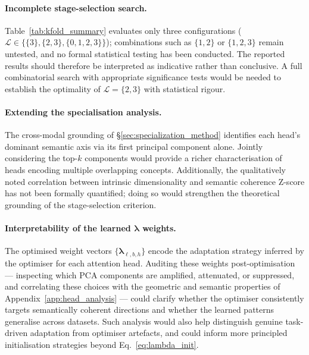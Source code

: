 \paragraph{Incomplete stage-selection search.}

Table~\ref{tab:kfold_summary} evaluates only three configurations 
($\mathcal{L} \in \{\{3\},\{2,3\},\{0,1,2,3\}\}$); combinations such 
as $\{1,2\}$ or $\{1,2,3\}$ remain untested, and no formal statistical 
testing has been conducted. The reported results should therefore be 
interpreted as indicative rather than conclusive. A full combinatorial 
search with appropriate significance tests would be needed to establish 
the optimality of $\mathcal{L}=\{2,3\}$ with statistical rigour.

\paragraph{Extending the specialisation analysis.}

The cross-modal grounding of \S\ref{sec:specialization_method} 
identifies each head's dominant semantic axis via its first principal 
component alone. Jointly considering the top-$k$ components would 
provide a richer characterisation of heads encoding multiple overlapping 
concepts. Additionally, the qualitatively noted correlation between 
intrinsic dimensionality and semantic coherence Z-score has not been 
formally quantified; doing so would strengthen the theoretical grounding 
of the stage-selection criterion.

\paragraph{Interpretability of the learned $\boldsymbol{\lambda}$ weights.}

The optimised weight vectors $\{\boldsymbol{\lambda}_{\ell,b,h}\}$ encode
the adaptation strategy inferred by the optimiser for each attention head.
Auditing these weights post-optimisation — inspecting which PCA components
are amplified, attenuated, or suppressed, and correlating these choices
with the geometric and semantic properties of Appendix~\ref{app:head_analysis}
— could clarify whether the optimiser consistently targets semantically
coherent directions and whether the learned patterns generalise across
datasets. Such analysis would also help distinguish genuine task-driven
adaptation from optimiser artefacts, and could inform more principled
initialisation strategies beyond Eq.~\eqref{eq:lambda_init}.

